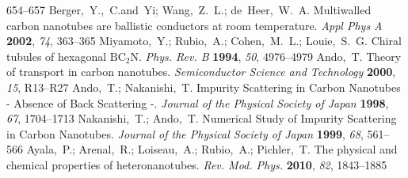 \documentclass[journal=nalefd,manuscript=article,layout=twocolumn]{achemso}
\begin{document}
\begin{mcitethebibliography}{48}
  654--657\relax
\mciteBstWouldAddEndPuncttrue
\mciteSetBstMidEndSepPunct{\mcitedefaultmidpunct}
{\mcitedefaultendpunct}{\mcitedefaultseppunct}\relax
\EndOfBibitem
{}
Berger,~Y.,~C.and~Yi; Wang,~Z.~L.; de~Heer,~W.~A. Multiwalled carbon nanotubes
  are ballistic conductors at room temperature. \emph{Appl Phys A}
  \textbf{2002}, \emph{74}, 363--365\relax
\mciteBstWouldAddEndPuncttrue
\mciteSetBstMidEndSepPunct{\mcitedefaultmidpunct}
{\mcitedefaultendpunct}{\mcitedefaultseppunct}\relax
\EndOfBibitem
{}
Miyamoto,~Y.; Rubio,~A.; Cohen,~M.~L.; Louie,~S.~G. Chiral tubules of hexagonal
  ${\mathrm{BC}}_{2}$N. \emph{Phys. Rev. B} \textbf{1994}, \emph{50},
  4976--4979\relax
\mciteBstWouldAddEndPuncttrue
\mciteSetBstMidEndSepPunct{\mcitedefaultmidpunct}
{\mcitedefaultendpunct}{\mcitedefaultseppunct}\relax
\EndOfBibitem
{}
Ando,~T. Theory of transport in carbon nanotubes. \emph{Semiconductor Science
  and Technology} \textbf{2000}, \emph{15}, R13--R27\relax
\mciteBstWouldAddEndPuncttrue
\mciteSetBstMidEndSepPunct{\mcitedefaultmidpunct}
{\mcitedefaultendpunct}{\mcitedefaultseppunct}\relax
\EndOfBibitem
{}
Ando,~T.; Nakanishi,~T. Impurity Scattering in Carbon Nanotubes - Absence of
  Back Scattering -. \emph{Journal of the Physical Society of Japan}
  \textbf{1998}, \emph{67}, 1704--1713\relax
\mciteBstWouldAddEndPuncttrue
\mciteSetBstMidEndSepPunct{\mcitedefaultmidpunct}
{\mcitedefaultendpunct}{\mcitedefaultseppunct}\relax
\EndOfBibitem
{}
Nakanishi,~T.; Ando,~T. Numerical Study of Impurity Scattering in Carbon
  Nanotubes. \emph{Journal of the Physical Society of Japan} \textbf{1999},
  \emph{68}, 561--566\relax
\mciteBstWouldAddEndPuncttrue
\mciteSetBstMidEndSepPunct{\mcitedefaultmidpunct}
{\mcitedefaultendpunct}{\mcitedefaultseppunct}\relax
\EndOfBibitem
{}
Ayala,~P.; Arenal,~R.; Loiseau,~A.; Rubio,~A.; Pichler,~T. The physical and
  chemical properties of heteronanotubes. \emph{Rev. Mod. Phys.} \textbf{2010},
  \emph{82}, 1843--1885\relax
\mciteBstWouldAddEndPuncttrue
\mciteSetBstMidEndSepPunct{\mcitedefaultmidpunct}
{\mcitedefaultendpunct}{\mcitedefaultseppunct}\relax
\EndOfBibitem
{}

\end{mcitethebibliography}
\end{document}
